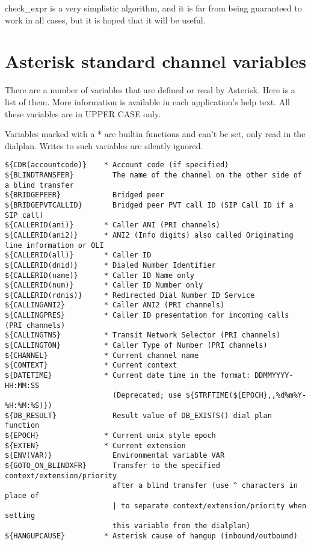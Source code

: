 check\_expr is a very simplistic algorithm, and it is far from being
guaranteed to work in all cases, but it is hoped that it will be
useful.

\section{Asterisk standard channel variables}

There are a number of variables that are defined or read
by Asterisk. Here is a list of them. More information is
available in each application's help text. All these variables
are in UPPER CASE only.

Variables marked with a * are builtin functions and can't be set,
only read in the dialplan.  Writes to such variables are silently
ignored.

\begin{verbatim}
${CDR(accountcode)}    * Account code (if specified)
${BLINDTRANSFER}         The name of the channel on the other side of a blind transfer
${BRIDGEPEER}            Bridged peer
${BRIDGEPVTCALLID}       Bridged peer PVT call ID (SIP Call ID if a SIP call)
${CALLERID(ani)}       * Caller ANI (PRI channels)
${CALLERID(ani2)}      * ANI2 (Info digits) also called Originating line information or OLI
${CALLERID(all)}       * Caller ID
${CALLERID(dnid)}      * Dialed Number Identifier
${CALLERID(name)}      * Caller ID Name only
${CALLERID(num)}       * Caller ID Number only
${CALLERID(rdnis)}     * Redirected Dial Number ID Service
${CALLINGANI2}         * Caller ANI2 (PRI channels)
${CALLINGPRES}         * Caller ID presentation for incoming calls (PRI channels)
${CALLINGTNS}          * Transit Network Selector (PRI channels)
${CALLINGTON}          * Caller Type of Number (PRI channels)
${CHANNEL}             * Current channel name
${CONTEXT}             * Current context
${DATETIME}            * Current date time in the format: DDMMYYYY-HH:MM:SS
                         (Deprecated; use ${STRFTIME(${EPOCH},,%d%m%Y-%H:%M:%S)})
${DB_RESULT}             Result value of DB_EXISTS() dial plan function
${EPOCH}               * Current unix style epoch
${EXTEN}               * Current extension
${ENV(VAR)}              Environmental variable VAR
${GOTO_ON_BLINDXFR}      Transfer to the specified context/extension/priority
                         after a blind transfer (use ^ characters in place of
                         | to separate context/extension/priority when setting
                         this variable from the dialplan)
${HANGUPCAUSE}         * Asterisk cause of hangup (inbound/outbound)

\end{verbatim}
